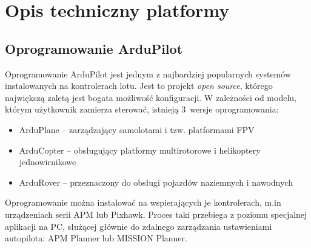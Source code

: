 \renewcommand{\thechapter}{\Alph{chapter}}
\chapter{Opis techniczny platformy}
\label{cha:opis_techniczny}

\section{Oprogramowanie ArduPilot}
Oprogramowanie ArduPilot jest jednym z najbardziej popularnych systemów instalowanych na kontrolerach lotu. 
Jest to projekt \textit{open source}, którego największą zaletą jest bogata możliwość konfiguracji. 
W zależności od modelu, którym użytkownik zamierza sterować, istnieją 3~wersje oprogramowania: 
\begin{itemize}
	\item ArduPlane -- zarządzający samolotami i tzw. platformami FPV
	\item ArduCopter -- obsługujący platformy multirotorowe i helikoptery jednowirnikowe
	\item ArduRover -- przeznaczony do obsługi pojazdów naziemnych i nawodnych
\end{itemize}
Oprogramowanie można instalować na wspierających je kontrolerach, m.in urządzeniach serii APM lub Pixhawk. 
Proces taki przebiega z poziomu specjalnej aplikacji na PC, służącej głównie do zdalnego zarządzania ustawieniami autopilota: APM Planner lub MISSION Planner.

